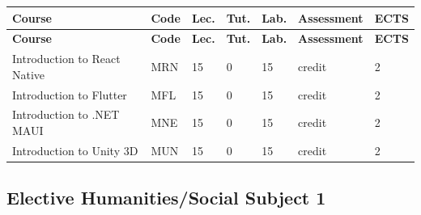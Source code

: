 \documentclass[12pt,a4paper]{article}
\newcommand{\thdrule}{\noalign{\global\setlength{\extrarowheight}{0pt}}}
\newcommand{\thdend}{\noalign{\global\setlength{\extrarowheight}{4pt}}}
\begin{document}
{\scriptsize
\begin{longtable}{m{5.5cm}m{0.8cm}m{1cm}m{1cm}m{1cm}m{1.7cm}m{0.7cm}}
\thdrule\toprule
\rowcolor{pjatkRed}
{\color{white}\footnotesize\textbf{\vphantom{Ag}Course}} & {\color{white}\footnotesize\textbf{\vphantom{Ag}Code}} & {\color{white}\footnotesize\textbf{\vphantom{Ag}Lec.}} & {\color{white}\footnotesize\textbf{\vphantom{Ag}Tut.}} & {\color{white}\footnotesize\textbf{\vphantom{Ag}Lab.}} & {\color{white}\footnotesize\textbf{\vphantom{Ag}Assessment}} & {\color{white}\footnotesize\textbf{\vphantom{Ag}ECTS}} \\
\midrule\thdend
\endfirsthead
\thdrule\toprule
\rowcolor{pjatkRed}
{\color{white}\footnotesize\textbf{\vphantom{Ag}Course}} & {\color{white}\footnotesize\textbf{\vphantom{Ag}Code}} & {\color{white}\footnotesize\textbf{\vphantom{Ag}Lec.}} & {\color{white}\footnotesize\textbf{\vphantom{Ag}Tut.}} & {\color{white}\footnotesize\textbf{\vphantom{Ag}Lab.}} & {\color{white}\footnotesize\textbf{\vphantom{Ag}Assessment}} & {\color{white}\footnotesize\textbf{\vphantom{Ag}ECTS}} \\
\midrule\thdend
\endhead
\rowcolor{tableRowLight} Introduction to React Native & MRN & 15 & 0 & 15 & {\scriptsize credit} & 2 \\
\rowcolor{tableRowAlt} Introduction to Flutter & MFL & 15 & 0 & 15 & {\scriptsize credit} & 2 \\
\rowcolor{tableRowLight} Introduction to .NET MAUI & MNE & 15 & 0 & 15 & {\scriptsize credit} & 2 \\
\rowcolor{tableRowAlt} Introduction to Unity 3D & MUN & 15 & 0 & 15 & {\scriptsize credit} & 2 \\
\bottomrule
\end{longtable}}

\subsection*{Elective Humanities/Social Subject 1}
\end{document}
